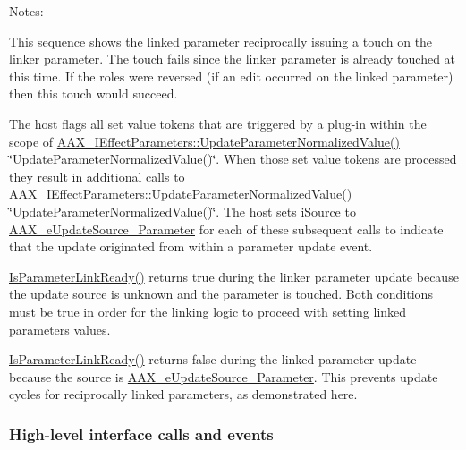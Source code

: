Notes\+:
\begin{DoxyEnumerate}
\item This sequence shows the linked parameter reciprocally issuing a touch on the linker parameter. The touch fails since the linker parameter is already touched at this time. If the roles were reversed (if an edit occurred on the linked parameter) then this touch would succeed.
\item The host flags all set value tokens that are triggered by a plug-\/in within the scope of \mbox{\hyperlink{a01669_a685858711efb8634ce66c327f2865c71}{A\+A\+X\+\_\+\+I\+Effect\+Parameters\+::\+Update\+Parameter\+Normalized\+Value()}} \char`\"{}\+Update\+Parameter\+Normalized\+Value()\char`\"{}. When those set value tokens are processed they result in additional calls to \mbox{\hyperlink{a01669_a685858711efb8634ce66c327f2865c71}{A\+A\+X\+\_\+\+I\+Effect\+Parameters\+::\+Update\+Parameter\+Normalized\+Value()}} \char`\"{}\+Update\+Parameter\+Normalized\+Value()\char`\"{}. The host sets {\ttfamily i\+Source} to \mbox{\hyperlink{a00491_a30be0398faf20c6b121239eb9399f3f7a401db669e68d5255c1126f7bf183b7ca}{A\+A\+X\+\_\+e\+Update\+Source\+\_\+\+Parameter}} for each of these subsequent calls to indicate that the update originated from within a parameter update event.
\item \mbox{\hyperlink{a01481_adf4d2d6060bf3e13619838cea8b59865}{Is\+Parameter\+Link\+Ready()}} returns {\ttfamily true} during the linker parameter update because the update source is unknown and the parameter is touched. Both conditions must be true in order for the linking logic to proceed with setting linked parameters\textquotesingle{} values.
\item \mbox{\hyperlink{a01481_adf4d2d6060bf3e13619838cea8b59865}{Is\+Parameter\+Link\+Ready()}} returns {\ttfamily false} during the linked parameter update because the source is \mbox{\hyperlink{a00491_a30be0398faf20c6b121239eb9399f3f7a401db669e68d5255c1126f7bf183b7ca}{A\+A\+X\+\_\+e\+Update\+Source\+\_\+\+Parameter}}. This prevents update cycles for reciprocally linked parameters, as demonstrated here.
\end{DoxyEnumerate}\hypertarget{a00825_linkedParameters_sequences_user_gui_highLevel}{}\subsubsection{High-\/level interface calls and events}\label{a00825_linkedParameters_sequences_user_gui_highLevel}

